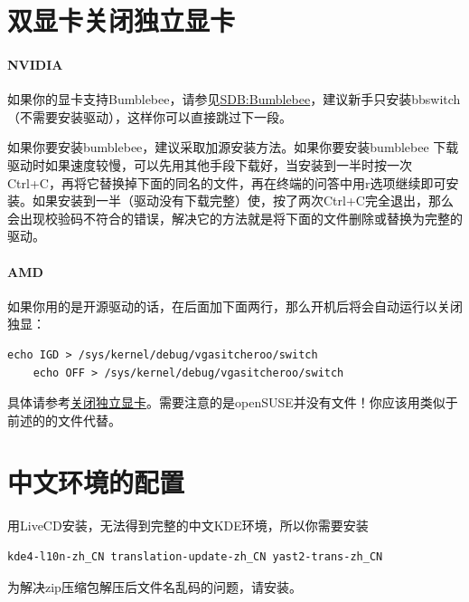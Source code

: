 \section[双显卡]{双显卡关闭独立显卡}
\paragraph{NVIDIA} 如果你的显卡支持Bumblebee，请参见\href{https://zh.opensuse.org/SDB:Bumblebee}{SDB:Bumblebee}，建议新手只安装bbswitch（不需要安装驱动），这样你可以直接跳过下一段。

如果你要安装bumblebee，建议采取加源安装方法。如果你要安装bumblebee
下载驱动时如果速度较慢，可以先用其他手段下载好，当安装到一半时按一次Ctrl+C，再将它替换掉下面的同名的文件，再在终端的问答中用r选项继续即可安装。如果安装到一半（驱动没有下载完整）使，按了两次Ctrl+C完全退出，那么会出现校验码不符合的错误，解决它的方法就是将下面的文件删除或替换为完整的驱动。

\paragraph{AMD} 如果你用的是开源驱动的话，在后面加下面两行，那么开机后将会自动运行以关闭独显：
\begin{Verbatim}[formatcom=\color{codec}]
    echo IGD > /sys/kernel/debug/vgasitcheroo/switch
    echo OFF > /sys/kernel/debug/vgasitcheroo/switch    
\end{Verbatim}
具体请参考\href{https://linuxtoy.org/archives/how-to-use-vga-switcheroo-disable-video-card-linux-kms.html}{关闭独立显卡}。需要注意的是openSUSE并没有文件！你应该用类似于前述的的文件代替。 

\section{中文环境的配置}
用LiveCD安装，无法得到完整的中文KDE环境，所以你需要安装
\begin{Verbatim}[formatcom=\color{codec}]
    kde4-l10n-zh_CN translation-update-zh_CN yast2-trans-zh_CN
\end{Verbatim}

为解决zip压缩包解压后文件名乱码的问题，请安装。

